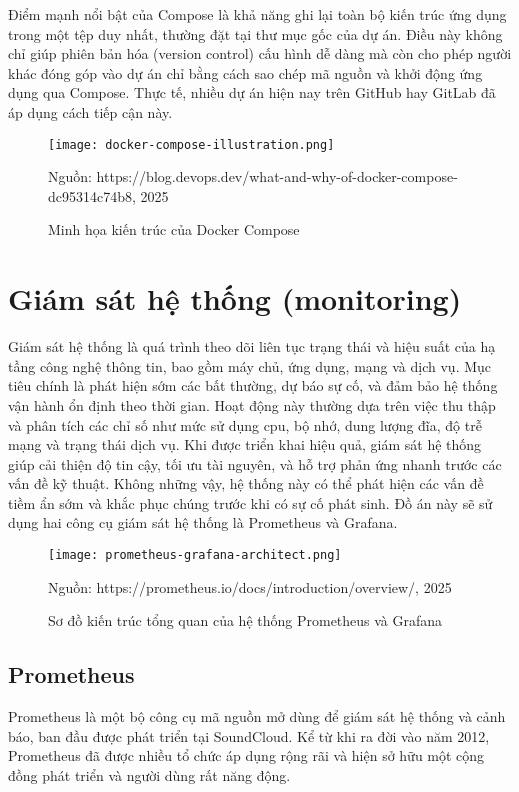 Điểm mạnh nổi bật của Compose là khả năng ghi lại toàn bộ kiến trúc ứng dụng trong một tệp duy nhất, thường đặt tại thư mục gốc của dự án. Điều này không chỉ giúp phiên bản hóa (version control) cấu hình dễ dàng mà còn cho phép người khác đóng góp vào dự án chỉ bằng cách sao chép mã nguồn và khởi động ứng dụng qua Compose. Thực tế, nhiều dự án hiện nay trên GitHub hay GitLab đã áp dụng cách tiếp cận này.

\begin{figure}[htbp]
    \centering
    \texttt{[image: docker-compose-illustration.png]}
    \caption{Minh họa kiến trúc của Docker Compose}
    \footnotesize{Nguồn: https://blog.devops.dev/what-and-why-of-docker-compose-dc95314c74b8, 2025}
\end{figure}

\section{Giám sát hệ thống (monitoring)}

Giám sát hệ thống là quá trình theo dõi liên tục trạng thái và hiệu suất của hạ tầng công nghệ thông tin, bao gồm máy chủ, ứng dụng, mạng và dịch vụ. Mục tiêu chính là phát hiện sớm các bất thường, dự báo sự cố, và đảm bảo hệ thống vận hành ổn định theo thời gian. Hoạt động này thường dựa trên việc thu thập và phân tích các chỉ số như mức sử dụng \gls{cpu}, bộ nhớ, dung lượng đĩa, độ trễ mạng và trạng thái dịch vụ. Khi được triển khai hiệu quả, giám sát hệ thống giúp cải thiện độ tin cậy, tối ưu tài nguyên, và hỗ trợ phản ứng nhanh trước các vấn đề kỹ thuật. Không những vậy, hệ thống này có thể phát hiện các vấn đề tiềm ẩn sớm và khắc phục chúng trước khi có sự cố phát sinh. Đồ án này sẽ sử dụng hai công cụ giám sát hệ thống là Prometheus và Grafana.

\begin{figure}[htbp]
    \centering
    \texttt{[image: prometheus-grafana-architect.png]}
    \caption{Sơ đồ kiến trúc tổng quan của hệ thống Prometheus và Grafana}
    \footnotesize{Nguồn: https://prometheus.io/docs/introduction/overview/, 2025}
\end{figure}

\subsection{Prometheus}

Prometheus \autocite{prometheus} là một bộ công cụ mã nguồn mở dùng để giám sát hệ thống và cảnh báo, ban đầu được phát triển tại SoundCloud. Kể từ khi ra đời vào năm 2012, Prometheus đã được nhiều tổ chức áp dụng rộng rãi và hiện sở hữu một cộng đồng phát triển và người dùng rất năng động.

